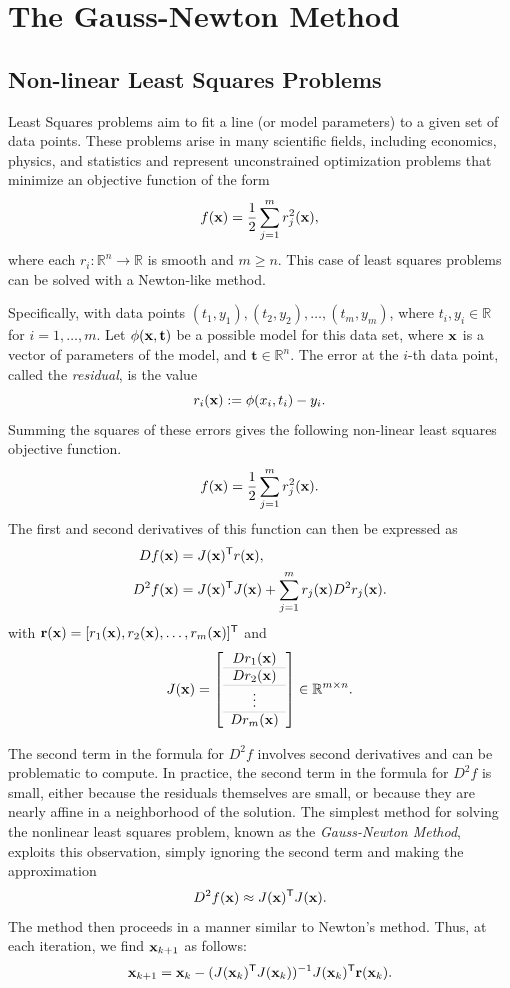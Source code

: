 \section*{The Gauss-Newton Method} %

\subsection*{Non-linear Least Squares Problems}

Least Squares problems aim to fit a line (or model parameters) to a given set of data points.
These problems arise in many scientific fields, including economics, physics, and statistics and represent unconstrained optimization problems that minimize an objective function of the form
$$
f(\mathbf{x}) = \frac{1}{2}\displaystyle\sum_{j=1}^m r_j^2(\mathbf{x}),
$$
where each $r_i : \mathbb{R}^n \rightarrow \mathbb{R}$ is smooth and $m \geq n$.
This case of least squares problems can be solved with a Newton-like method.

Specifically, with data points $(t_1, y_1), (t_2, y_2), \ldots, (t_m, y_m)$, where $t_i,y_i \in \mathbb{R}$ for $i = 1, \ldots, m$.
Let $\phi(\mathbf{x}, \mathbf{t)}$ be a possible model for this data set, where $\mathbf{x}$ is a vector of parameters of the model, and $\mathbf{t} \in \mathbb{R}^n$.
The error at the $i$-th data point, called the \emph{residual}, is the value $$r_i(\mathbf{x}) := \phi(x_i, t_i) - y_i.$$
Summing the squares of these errors gives the following non-linear least squares objective function.
$$
f(\mathbf{x}) = \frac{1}{2} \displaystyle \sum_{j=1}^m  r_j^2(\mathbf{x}).
$$
The first and second derivatives of this function can then be expressed as
\begin{align*}
Df(\mathbf{x}) &= J(\mathbf{x})^{\mathsf T}  r(\mathbf{x}), \\
D^2 f(\mathbf{x}) &= J(\mathbf{x})^{\mathsf T} J(\mathbf{x}) + \displaystyle \sum_{j=1}^m r_j(\mathbf{x}) D^2r_j(\mathbf{x}).
\end{align*}
with $\mathbf{r}(\mathbf{x}) = [r_1(\mathbf{x}), r_2(\mathbf{x}), \ldots, r_m(\mathbf{x})]^{\mathsf T} $ and
\[
J(\x) =
\left[\begin{array}{c}
\arrayrulecolor{lightgray}
D r_1(\x) \\\hline D r_2(\x) \\\hline \vdots \\\hline D r_m(\x)
\end{array}\right] \in \mathbb{R}^{m\times n}.
\]

The second term in the formula for $D^2 f$ involves second derivatives and can be problematic to compute.
In practice, the second term in the formula for $D^2 f$ is small, either because the residuals themselves are small, or because they are nearly affine in a neighborhood of the solution.
The simplest method for solving the nonlinear least squares problem, known as the \emph{Gauss-Newton Method}, exploits this observation, simply ignoring the second term and making the approximation
$$
D^2 f(\mathbf{x}) \approx J(\mathbf{x})^{\mathsf T} J(\mathbf{x}).
$$
The method then proceeds in a manner similar to Newton's method.
Thus, at each iteration, we find $\mathbf{x}_{k+1}$ as follows:
\begin{equation} \label{Eq:GaussNewtonUpdate}
\mathbf{x}_{k+1} = \mathbf{x}_k-(J(\mathbf{x}_k)^{\mathsf T} J(\mathbf{x}_k))^{-1}J( \mathbf{x}_k)^{\mathsf T}  \mathbf{r}( \mathbf{x}_k).
\end{equation}

